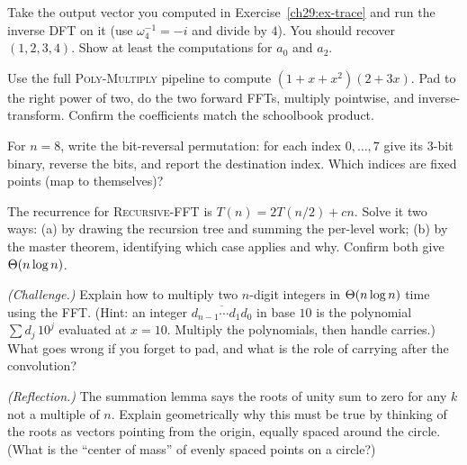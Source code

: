 \begin{exercise}\label{ch29:ex-inverse}
Take the output vector you computed in Exercise~\ref{ch29:ex-trace} and run the
inverse DFT on it (use $\omega_4^{-1}=-i$ and divide by $4$). You should recover
$(1,2,3,4)$. Show at least the computations for $a_0$ and $a_2$.
\end{exercise}

\begin{exercise}\label{ch29:ex-multiply}
Use the full \textsc{Poly-Multiply} pipeline to compute $(1 + x + x^2)(2 + 3x)$.
Pad to the right power of two, do the two forward FFTs, multiply pointwise, and
inverse-transform. Confirm the coefficients match the schoolbook product.
\end{exercise}

\begin{exercise}\label{ch29:ex-bitrev}
For $n=8$, write the bit-reversal permutation: for each index $0,\dots,7$ give its
$3$-bit binary, reverse the bits, and report the destination index. Which indices are
fixed points (map to themselves)?
\end{exercise}

\begin{exercise}\label{ch29:ex-recurrence}
The recurrence for \textsc{Recursive-FFT} is $T(n) = 2T(n/2) + cn$. Solve it two
ways: (a) by drawing the recursion tree and summing the per-level work; (b) by the
master theorem, identifying which case applies and why. Confirm both give
$\Theta(n\log n)$.
\end{exercise}

\begin{exercise}\label{ch29:ex-bignum}
\emph{(Challenge.)} Explain how to multiply two $n$-digit integers in $\Theta(n\log n)$
time using the FFT. (Hint: an integer $\overline{d_{n-1}\cdots d_1 d_0}$ in base $10$
is the polynomial $\sum d_j\,10^j$ evaluated at $x=10$. Multiply the polynomials,
then handle carries.) What goes wrong if you forget to pad, and what is the role of
carrying after the convolution?
\end{exercise}

\begin{exercise}\label{ch29:ex-strang}
\emph{(Reflection.)} The summation lemma says the roots of unity sum to zero for any
$k$ not a multiple of $n$. Explain geometrically why this must be true by thinking of
the roots as vectors pointing from the origin, equally spaced around the circle.
(What is the ``center of mass'' of evenly spaced points on a circle?)
\end{exercise}
